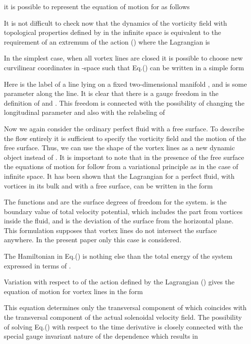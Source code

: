 it is possible to represent the equation of motion for  
as follows

It is not difficult to check now that the dynamics of the vorticity field with 
topological properties defined by  in the infinite 
space is equivalent to the requirement of an extremum of the action 
() 
where the Lagrangian is  


In the simplest case, when all vortex lines are closed 
it is possible to choose new 
curvilinear coordinates  in -space such that  
Eq.() can be written in a simple form

Here  is the label of a line lying on a fixed two-dimensional manifold
, and  is some parameter along the line.
It is clear that there is a gauge freedom in the definition of  and .
This freedom is connected with the possibility of changing the longitudinal parameter 
 and also with the relabeling of 


Now we again consider the ordinary perfect fluid with a free surface.
To describe the flow entirely it is sufficient to
specify the vorticity field  and the motion of
the free surface. Thus, we can use the shape 
 of the vortex lines as a new dynamic object instead of 
. It is important to note 
that in the presence of the free surface the equations of motion 
for  follow from a variational principle
as in the case of infinite space. It has been shown 
 that the Lagrangian for a perfect fluid, with vortices in its bulk 
and with a free surface, can be written in the form

The functions  and 
are the surface degrees of freedom for the system.  is the boundary
value of total velocity potential, which includes the part from vortices 
inside the fluid, 
and  is the deviation of the surface from the horizontal plane.
This formulation supposes that vortex lines do not intersect the 
surface anywhere. In the present paper only this case is considered.

The Hamiltonian  in Eq.() 
is nothing else than the total energy of the 
system expressed in terms of .

Variation with respect to 
 of the action defined by the Lagrangian () 
gives the equation of motion for vortex lines in the form

This equation determines only the transversal component of 
which coincides with the transversal component of the actual solenoidal 
velocity field. The possibility of solving Eq.() 
with respect to the time derivative  is closely connected with the 
special gauge invariant nature of the  dependence which results in 
 

